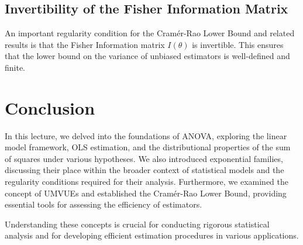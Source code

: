 \documentclass[open=any, 11pt,paper=A4]{scrreprt}
\begin{document}
\subsection{Invertibility of the Fisher Information Matrix}

An important regularity condition for the Cramér-Rao Lower Bound and related results is that the Fisher Information matrix $I(\theta)$ is invertible. This ensures that the lower bound on the variance of unbiased estimators is well-defined and finite.

\section{Conclusion}

In this lecture, we delved into the foundations of ANOVA, exploring the linear model framework, OLS estimation, and the distributional properties of the sum of squares under various hypotheses. We also introduced exponential families, discussing their place within the broader context of statistical models and the regularity conditions required for their analysis. Furthermore, we examined the concept of UMVUEs and established the Cramér-Rao Lower Bound, providing essential tools for assessing the efficiency of estimators.

Understanding these concepts is crucial for conducting rigorous statistical analysis and for developing efficient estimation procedures in various applications.



















\iffalse


\appendix

\numberwithin{definition}{section}
\numberwithin{theorem}{section}
\numberwithin{proposition}{section}
\numberwithin{lemma}{section}
\numberwithin{corollary}{section}
\numberwithin{remark}{section}
\numberwithin{example}{section}
\numberwithin{supplement}{section}

\chapter{Appendix to the chapters} \label{ch:appendix}
\section{Introducing the problem}\label{sec: appendix to chap 1}

.....

\fi 

\medskip
\end{document}
